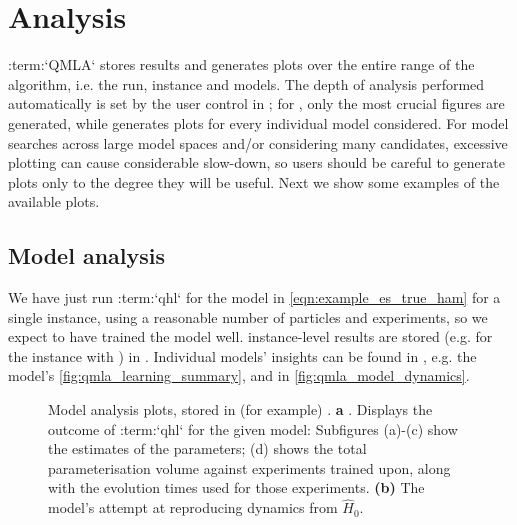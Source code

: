 \section{Analysis}
:term:`QMLA` stores results and generates plots
    over the entire range of the algorithm\footnotemark, i.e. the run, instance and models. 
The depth of analysis performed automatically is set by the user control  in ;
    for , only the most crucial figures are generated, while  generates plots for every individual 
    model considered. 
For model searches across large model spaces and/or considering many candidates,
    excessive plotting can cause considerable slow-down, so users should be careful to generate plots only 
    to the degree they will be useful. 
Next we show some examples of the available plots. 
\par 

\subsection{Model analysis}

We have just run :term:`qhl` for the model in \cref{eqn:example_es_true_ham} for a single instance, 
    using a reasonable number of particles and experiments, so we expect to have trained the model well. 
instance-level results are stored (e.g. for the instance with ) in .
Individual models' insights can be found in , 
    e.g. the model's  \cref{fig:qmla_learning_summary}, and  in \cref{fig:qmla_model_dynamics}.
\par 

\begin{figure}[H]
    \begin{center}
    \qquad
    \end{center}
    \caption[Model analysis plots]{
        Model analysis plots, stored in (for example) . 
        \textbf{a} . 
        Displays the outcome of :term:`qhl` for the given model:
        Subfigures (a)-(c) show the estimates of the parameters; 
        (d) shows the total parameterisation volume against experiments trained upon, 
        along with the evolution times used for those experiments. 
        \textbf{(b)}  The model's attempt at reproducing dynamics from $\hat{H}_{0}$. 
    }
    \label{fig:model_analysis}
\end{figure}

